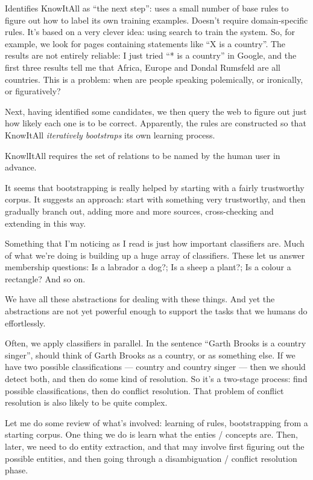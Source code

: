 Identifies KnowItAll as ``the next step'': uses a small number of base
rules to figure out how to label its own training examples.  Doesn't
require domain-specific rules.  It's based on a very clever idea:
using search to train the system.  So, for example, we look for pages
containing statements like ``X is a country''.  The results are not
entirely reliable: I just tried ``* is a country'' in Google, and the
first three results tell me that Africa, Europe and Dondal Rumsfeld
are all countries.  This is a problem: when are people speaking
polemically, or ironically, or figuratively?

Next, having identified some candidates, we then query the web to
figure out just how likely each one is to be correct.  Apparently, the
rules are constructed so that KnowItAll \emph{iteratively bootstraps}
its own learning process.

KnowlItAll requires the set of relations to be named by the human user
in advance.  

It seems that bootstrapping is really helped by starting with a fairly
trustworthy corpus.  It suggests an approach: start with something
very trustworthy, and then gradually branch out, adding more and more
sources, cross-checking and extending in this way. 

Something that I'm noticing as I read is just how important
classifiers are.  Much of what we're doing is building up a huge array
of classifiers.  These let us answer membership questions: Is a
labrador a dog?; Is a sheep a plant?; Is a colour a rectangle?  And so
on.

We have all these abstractions for dealing with these things.  And yet
the abstractions are not yet powerful enough to support the tasks that
we humans do effortlessly.

Often, we apply classifiers in parallel.  In the sentence ``Garth
Brooks is a country singer'', should think of Garth Brooks as a
country, or as something else.  If we have two possible
classifications --- country and country singer --- then we should
detect both, and then do some kind of resolution.  So it's a two-stage
process: find possible classifications, then do conflict resolution.
That problem of conflict resolution is also likely to be quite
complex.

Let me do some review of what's involved: learning of rules,
bootstrapping from a starting corpus.  One thing we do is learn what
the enties / concepts are.  Then, later, we need to do entity
extraction, and that may involve first figuring out the possible
entities, and then going through a disambiguation / conflict
resolution phase.

